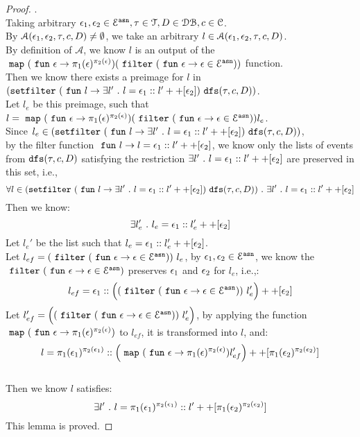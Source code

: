 \begin{proof}.
\\
Taking arbitrary $\mathtt{\epsilon}_1, \mathtt{\epsilon}_2 \in \mathcal{E}^{\mathtt{{asn}}}, \mathtt{\tau} \in \mathcal{T}, D \in \mathcal{DB} , c \in \mathcal{C}$.
\\
By $\mathcal{A}(\mathtt{\epsilon}_1, \mathtt{\epsilon}_2, \mathtt{\tau}, c, D) \neq \emptyset$, we take an arbitrary $l \in \mathcal{A}(\mathtt{\epsilon}_1, \mathtt{\epsilon}_2, \mathtt{\tau}, c, D)$.
\\
By definition of $\mathcal{A}$, we know $l$ is an output of the $~\mathtt{map}~ (~\mathtt{fun}~  \mathtt{\epsilon} \to \pi_1(\mathtt{\epsilon})^{\pi_2(\mathtt{\epsilon})}) (~\mathtt{filter}~ (~\mathtt{fun}~ \mathtt{\epsilon} \to  \mathtt{\epsilon} \in \mathcal{E}^{\mathtt{{asn}}}))$ function.
\\
Then we know there exists a preimage for $l$ in 
$(\mathtt{setfilter} ~(~\mathtt{fun}~ l \to \exists l' ~.~ l = \mathtt{\epsilon}_1 :: l' ++ [\mathtt{\epsilon}_2]) ~ \mathtt{dfs}(\mathtt{\tau}, c, D)) $. 
\\
Let $l_e$ be this preimage, such that
 $l = ~\mathtt{map}~ (~\mathtt{fun}~  \mathtt{\epsilon} \to \pi_1(\mathtt{\epsilon})^{\pi_2(\mathtt{\epsilon})}) (~\mathtt{filter}~ (~\mathtt{fun}~ \mathtt{\epsilon} \to  \mathtt{\epsilon} \in \mathcal{E}^{\mathtt{{asn}}})) l_e$.
\\
Since $l_e \in (\mathtt{setfilter} ~(~\mathtt{fun}~ l \to \exists l' ~.~ l = \mathtt{\epsilon}_1 :: l' ++ [\mathtt{\epsilon}_2]) ~ \mathtt{dfs}(\mathtt{\tau}, c, D))$,
\\
by the filter function $~\mathtt{fun}~ l \to l = \mathtt{\epsilon}_1 :: l' ++ [\mathtt{\epsilon}_2]$,
we know only the lists of events from $\mathtt{dfs}(\mathtt{\tau}, c, D)$ satisfying the restriction 
$\exists l' ~.~ l = \mathtt{\epsilon}_1 :: l' ++ [\mathtt{\epsilon}_2]$ are preserved in this set, i.e.,
\[
	\forall l \in (\mathtt{setfilter} ~(~\mathtt{fun}~ l \to \exists l' ~.~ l = \mathtt{\epsilon}_1 :: l' ++ [\mathtt{\epsilon}_2]) ~ \mathtt{dfs}(\mathtt{\tau}, c, D))
	~.~ \exists l' ~.~ l = \mathtt{\epsilon}_1 :: l' ++ [\mathtt{\epsilon}_2] 
\]
%
Then we know:
%
\[
 \exists l_e' ~.~ l_e = \mathtt{\epsilon}_1 :: l_e' ++ [\mathtt{\epsilon}_2] 
\]
%
Let $l_e'$ be the list such that $l_e = \mathtt{\epsilon}_1 :: l_e' ++ [\mathtt{\epsilon}_2] $.
\\
Let $l_{ef} = (~\mathtt{filter}~ (~\mathtt{fun}~ \mathtt{\epsilon} \to  \mathtt{\epsilon} \in \mathcal{E}^{\mathtt{{asn}}})) ~ l_e$, 
by $\mathtt{\epsilon}_1, \mathtt{\epsilon}_2 \in \mathcal{E}^{\mathtt{{asn}}}$, 
we know the $~\mathtt{filter}~ (~\mathtt{fun}~ \mathtt{\epsilon} \to  \mathtt{\epsilon} \in \mathcal{E}^{\mathtt{{asn}}})$ preserves $\mathtt{\epsilon}_1$ and $\mathtt{\epsilon}_2$ for 
$l_e$, i.e.,:
\[
	l_{ef} = \mathtt{\epsilon}_1 :: \Big((~\mathtt{filter}~ (~\mathtt{fun}~ \mathtt{\epsilon} \to  \mathtt{\epsilon} \in \mathcal{E}^{\mathtt{{asn}}}))~ l_e' \Big) ++ [\mathtt{\epsilon}_2]
\]
%
Let $l_{ef}' = \Big((~\mathtt{filter}~ (~\mathtt{fun}~ \mathtt{\epsilon} \to  \mathtt{\epsilon} \in \mathcal{E}^{\mathtt{{asn}}}))~ l_e' \Big)$, by applying the function
$~\mathtt{map}~ (~\mathtt{fun}~  \mathtt{\epsilon} \to \pi_1(\mathtt{\epsilon})^{\pi_2(\mathtt{\epsilon})})$ to 
$l_{ef}$, it is transformed into $l$, and:
\[
	l = 
	\pi_1(\mathtt{\epsilon}_1)^{\pi_2(\mathtt{\epsilon}_1)} :: \Big( ~\mathtt{map}~ (~\mathtt{fun}~  \mathtt{\epsilon} \to \pi_1(\mathtt{\epsilon})^{\pi_2(\mathtt{\epsilon})}) l_{ef}' \Big) ++ [\pi_1(\mathtt{\epsilon}_2)^{\pi_2(\mathtt{\epsilon}_2)}]
\]
%
\\
%
Then we know $l$ satisfies:
\[
	\exists l' ~.~ l = \pi_1(\mathtt{\epsilon}_1)^{\pi_2(\mathtt{\epsilon}_1)} :: l' ++ [\pi_1(\mathtt{\epsilon}_2)^{\pi_2(\mathtt{\epsilon}_2)}]
\]
%
This lemma is proved.
\end{proof}
